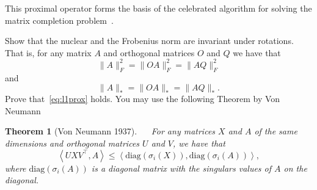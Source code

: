 \documentclass[11pt]{article}
\newcommand{\norm}[1]{\lVert#1\rVert}
\newcommand{\dotprod}[1]{\left< #1\right>}
\newtheorem{theorem}{Theorem}[section]
\begin{document}
     This proximal operator forms the basis of the celebrated algorithm for solving the matrix completion problem~\cite{CaiCandes:2010}.
  \begin{ExerciseList}
    \Exercise
    

\ExePart \label{Is} Show that the nuclear and the Frobenius norm are invariant under rotations. That is, for any matrix $A$ and orthogonal matrices $O$ and $Q$ we have that
\[\norm{A}_F^2 = \norm{OA}_F^2 = \norm{AQ}_F^2\] 
and
\[\norm{A}_* = \norm{OA}_* = \norm{AQ}_*.\] 
     \label{IIs}   Prove that~\eqref{eq:l1prox} holds. You may use the following Theorem by Von Neumann
     \begin{theorem}[Von Neumann 1937]\label{theo:von} $\quad$
     For any matrices $X$ and $A$ of the same dimensions and orthogonal matrices $U$ and $V$, we have that
     \begin{equation}
\dotprod{UXV^\top, A} \leq \dotprod{\mbox{diag}(\sigma_i(X)), \mbox{diag}(\sigma_i(A))},
     \end{equation}
     where $\mbox{diag}(\sigma_i(A))$ is a diagonal matrix with the singulars values of $A$ on the diagonal.
     \end{theorem}    
  

\end{ExerciseList}
\end{document}
